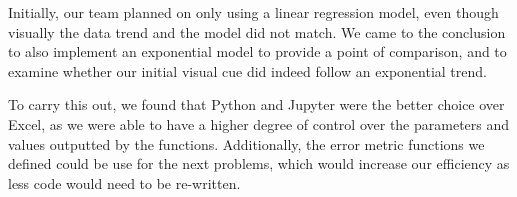 Initially, our team planned on only using a linear regression model, even though visually the data trend and the model did not match. We came to the conclusion to also implement an exponential model to provide a point of comparison, and to examine whether our initial visual cue did indeed follow an exponential trend.

To carry this out, we found that Python and Jupyter were the better choice over Excel, as we were able to have a higher degree of control over the parameters and values outputted by the functions. Additionally, the error metric functions we defined could be use for the next problems, which would increase our efficiency as less code would need to be re-written.

